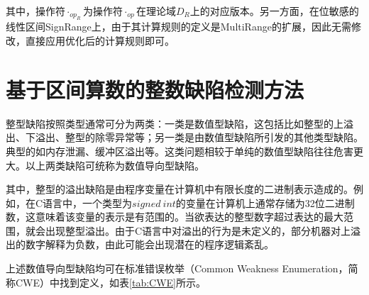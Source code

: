 其中，操作符$ \cdot_{op_R} $为操作符$ \cdot_{op} $在理论域$ D_R $上的对应版本。另一方面，在位敏感的线性区间SignRange上，由于其计算规则的定义是MultiRange的扩展，因此无需修改，直接应用优化后的计算规则即可。


\section{基于区间算数的整数缺陷检测方法}

整型缺陷按照类型通常可分为两类：一类是数值型缺陷，这包括比如整型的上溢出、下溢出、整型的除零异常等；另一类是由数值型缺陷所引发的其他类型缺陷。典型的如内存泄漏、缓冲区溢出等。这类问题相较于单纯的数值型缺陷往往危害更大。以上两类缺陷可统称为数值导向型缺陷。

其中，整型的溢出缺陷是由程序变量在计算机中有限长度的二进制表示造成的。例如，在C语言中，一个类型为$ signed ~int $的变量在计算机上通常存储为32位二进制数，这意味着该变量的表示是有范围的。当欲表达的整型数字超过表达的最大范围，就会出现整型溢出。由于C语言中对溢出的行为是未定义的，部分机器对上溢出的数字解释为负数，由此可能会出现潜在的程序逻辑紊乱。

上述数值导向型缺陷均可在标准错误枚举（Common Weakness Enumeration，简称CWE）中找到定义，如表\ref{tab:CWE}所示。


